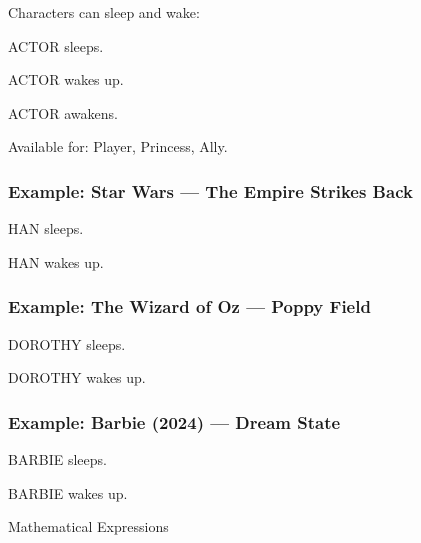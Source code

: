 \documentclass[11pt,letterpaper,oldstylefigures]{memoir}
\makeatletter
\newcommand{\stagedir}[1]{#1\par\vspace{1\baselineskip}}
\newenvironment{FountainExample}
  {\begingroup
  \ttfamily\small
   \setlength{\parindent}{0pt}
  \setlength{\parskip}{0.5em}
  \allowdisplaybreaks
  \setlength{\displaywidowpenalty}{0}
  \setlength{\widowpenalty}{0}
  \setlength{\clubpenalty}{0}
  \setlength{\interlinepenalty}{0}
}
  {\endgroup}
\let\oldchapter\chapter
\def\chapter{%
  \@ifstar
    {\FountainScripting@starchapter}%
    {\@dblarg\FountainScripting@chapter}}
\def\FountainScripting@starchapter#1{\oldchapter*{#1}\chaptermark{#1}}
\def\FountainScripting@chapter[#1]#2{\oldchapter[#1]{#2}\chaptermark{#2}}
\newcommand{\sectionbreak}{\newpage}
\makeatother
\begin{document}
Characters can sleep and wake:

\begin{FountainExample}
\stagedir{ACTOR sleeps.}
\end{FountainExample}

\begin{FountainExample}
\stagedir{ACTOR wakes up.}
\end{FountainExample}

\begin{FountainExample}
\stagedir{ACTOR awakens.}
\end{FountainExample}

Available for: Player, Princess, Ally.

\subsubsection{Example: Star Wars — The Empire Strikes Back}
\begin{FountainExample}
\stagedir{HAN sleeps.}
\end{FountainExample}

\begin{FountainExample}
\stagedir{HAN wakes up.}
\end{FountainExample}

\subsubsection{Example: The Wizard of Oz — Poppy Field}
\begin{FountainExample}
\stagedir{DOROTHY sleeps.}
\end{FountainExample}

\begin{FountainExample}
\stagedir{DOROTHY wakes up.}
\end{FountainExample}

\subsubsection{Example: Barbie (2024) — Dream State}
\begin{FountainExample}
\stagedir{BARBIE sleeps.}
\end{FountainExample}

\begin{FountainExample}
\stagedir{BARBIE wakes up.}
\end{FountainExample}

\chapter{Mathematical Expressions}
\label{ch:math}
\sectionbreak
\end{document}
